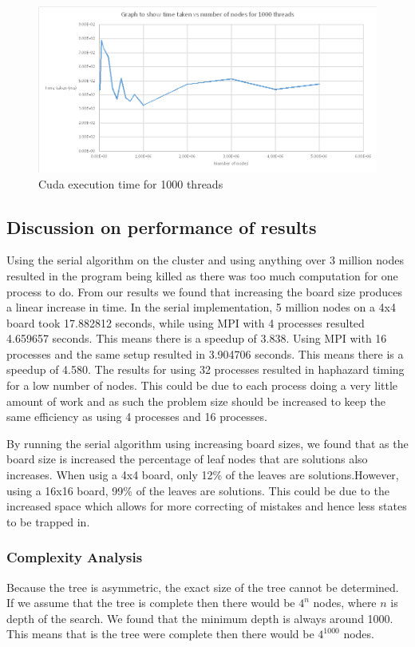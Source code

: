 \documentclass[a4paper]{report}
\begin{document}
\begin{figure}[H]
	\centering
	\includegraphics[width=1.3\textwidth]{images/cuda_1000threads}
	\caption{Cuda execution time for 1000 threads}
\end{figure}

\subsection{Discussion on performance of results}
Using the serial algorithm on the cluster and using anything over 3 million nodes resulted in the program being killed as there was too much computation for one process to do. From our results we found that increasing the board size produces a linear increase in time. In the serial implementation, 5 million nodes on a 4x4 board took 17.882812 seconds, while using MPI with 4 processes resulted 4.659657 seconds. This means there is a speedup of 3.838. Using MPI with 16 processes and the same setup resulted in 3.904706 seconds. This means there is a speedup of 4.580.
The results for using 32 processes resulted in haphazard timing for a low number of nodes. This could be due to each process doing a very little amount of work and as such the problem size should be increased to keep the same efficiency as using 4 processes and 16 processes. 

By running the serial algorithm using increasing board sizes, we found that as the board size is increased the percentage of leaf nodes that are solutions also increases. When usig a 4x4 board, only 12\% of the leaves are solutions.However, using a 16x16 board, 99\% of the leaves are solutions. This could be due to the increased space which allows for more correcting of mistakes and hence less states to be trapped in.

\subsubsection{Complexity Analysis}
Because the tree is asymmetric, the exact size of the tree cannot be determined. If we assume that the tree is complete then there would be $4^n$ nodes, where $n$ is depth of the search. We found that the minimum depth is always around 1000. This means that is the tree were complete then there would be $4^1000$ nodes. 
\end{document}
